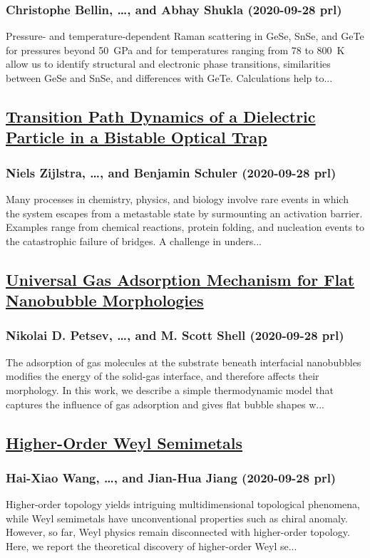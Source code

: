 \subsubsection*{Christophe Bellin, \dots, and Abhay Shukla (2020-09-28 prl)}
Pressure- and temperature-dependent Raman scattering in GeSe, SnSe, and GeTe for pressures beyond 50 GPa and for temperatures ranging from 78 to 800 K allow us to identify structural and electronic phase transitions, similarities between GeSe and SnSe, and differences with GeTe. Calculations help to...
\subsection*{\href{http://link.aps.org/doi/10.1103/PhysRevLett.125.146001}{Transition Path Dynamics of a Dielectric Particle in a Bistable Optical Trap}}
\subsubsection*{Niels Zijlstra, \dots, and Benjamin Schuler (2020-09-28 prl)}
Many processes in chemistry, physics, and biology involve rare events in which the system escapes from a metastable state by surmounting an activation barrier. Examples range from chemical reactions, protein folding, and nucleation events to the catastrophic failure of bridges. A challenge in unders...
\subsection*{\href{http://link.aps.org/doi/10.1103/PhysRevLett.125.146101}{Universal Gas Adsorption Mechanism for Flat Nanobubble Morphologies}}
\subsubsection*{Nikolai D. Petsev, \dots, and M. Scott Shell (2020-09-28 prl)}
The adsorption of gas molecules at the substrate beneath interfacial nanobubbles modifies the energy of the solid-gas interface, and therefore affects their morphology. In this work, we describe a simple thermodynamic model that captures the influence of gas adsorption and gives flat bubble shapes w...
\subsection*{\href{http://link.aps.org/doi/10.1103/PhysRevLett.125.146401}{Higher-Order Weyl Semimetals}}
\subsubsection*{Hai-Xiao Wang, \dots, and Jian-Hua Jiang (2020-09-28 prl)}
Higher-order topology yields intriguing multidimensional topological phenomena, while Weyl semimetals have unconventional properties such as chiral anomaly. However, so far, Weyl physics remain disconnected with higher-order topology. Here, we report the theoretical discovery of higher-order Weyl se...
